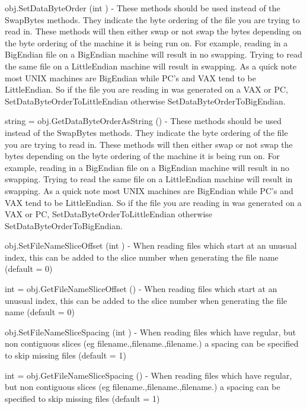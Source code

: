 \begin{DoxyItemize}
\item {\ttfamily obj.\-Set\-Data\-Byte\-Order (int )} -\/ These methods should be used instead of the Swap\-Bytes methods. They indicate the byte ordering of the file you are trying to read in. These methods will then either swap or not swap the bytes depending on the byte ordering of the machine it is being run on. For example, reading in a Big\-Endian file on a Big\-Endian machine will result in no swapping. Trying to read the same file on a Little\-Endian machine will result in swapping. As a quick note most U\-N\-I\-X machines are Big\-Endian while P\-C's and V\-A\-X tend to be Little\-Endian. So if the file you are reading in was generated on a V\-A\-X or P\-C, Set\-Data\-Byte\-Order\-To\-Little\-Endian otherwise Set\-Data\-Byte\-Order\-To\-Big\-Endian.  
\item {\ttfamily string = obj.\-Get\-Data\-Byte\-Order\-As\-String ()} -\/ These methods should be used instead of the Swap\-Bytes methods. They indicate the byte ordering of the file you are trying to read in. These methods will then either swap or not swap the bytes depending on the byte ordering of the machine it is being run on. For example, reading in a Big\-Endian file on a Big\-Endian machine will result in no swapping. Trying to read the same file on a Little\-Endian machine will result in swapping. As a quick note most U\-N\-I\-X machines are Big\-Endian while P\-C's and V\-A\-X tend to be Little\-Endian. So if the file you are reading in was generated on a V\-A\-X or P\-C, Set\-Data\-Byte\-Order\-To\-Little\-Endian otherwise Set\-Data\-Byte\-Order\-To\-Big\-Endian.  
\item {\ttfamily obj.\-Set\-File\-Name\-Slice\-Offset (int )} -\/ When reading files which start at an unusual index, this can be added to the slice number when generating the file name (default = 0)  
\item {\ttfamily int = obj.\-Get\-File\-Name\-Slice\-Offset ()} -\/ When reading files which start at an unusual index, this can be added to the slice number when generating the file name (default = 0)  
\item {\ttfamily obj.\-Set\-File\-Name\-Slice\-Spacing (int )} -\/ When reading files which have regular, but non contiguous slices (eg filename.,filename.,filename.) a spacing can be specified to skip missing files (default = 1)  
\item {\ttfamily int = obj.\-Get\-File\-Name\-Slice\-Spacing ()} -\/ When reading files which have regular, but non contiguous slices (eg filename.,filename.,filename.) a spacing can be specified to skip missing files (default = 1)  

\end{DoxyItemize}
